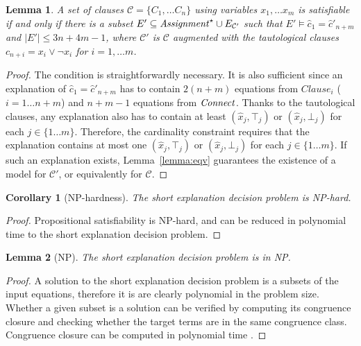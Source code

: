 \documentclass{easychair}
\newtheorem{corollary}{Corollary}
\newtheorem{lemma}{Lemma}
\begin{document}

\begin{lemma}
A set of clauses $\mathcal{C}= \{C_1, \dots C_n\}$ using variables $x_1,\dots
x_m$ is satisfiable if and only if there is a subset $E' \subseteq
{\it Assignment}^\star \cup E_{\mathcal{C}'}$ such that $E'\models \hat{c}_1 =
\hat{c}'_{n+m}$ and $|E'| \leq 3n+4m-1$, where $\mathcal{C}'$ is $\mathcal{C}$
augmented with the tautological clauses $c_{n+i} = x_i \vee \neg x_i$ for
$i=1,\dots m$.
\end{lemma}
\begin{proof}
The condition is straightforwardly necessary.  It is also sufficient since an
explanation of $\hat{c}_1 = \hat{c}'_{n+m}$ has to contain $2(n + m)$
equations from $Clause_i$ ($i= 1\dots n + m$) and $n + m - 1$ equations from
${\it Connect}$.  Thanks to the tautological clauses, any explanation also has to
contain at least $(\hat{x}_j,\top_j)$ or $(\hat{x}_j,\bot_j)$ for each
$j\in\{1\dots m\}$. Therefore, the cardinality constraint requires that the explanation
contains at most one $(\hat{x}_j,\top_j)$ or $(\hat{x}_j,\bot_j)$ for each
$j\in\{1\dots m\}$.  If such an explanation exists, Lemma~\ref{lemma:eqv}
guarantees the existence of a model for $\mathcal{C'}$, or equivalently for
$\mathcal{C}$.
\end{proof}




\begin{corollary}[NP-hardness]
\label{lemma:nphardness}
The short explanation decision problem is NP-hard.
\end{corollary}
\begin{proof}
Propositional satisfiability is NP-hard, and can be reduced in polynomial time
to the short explanation decision problem.
\end{proof}

\begin{lemma}[NP]
\label{lemma:innp}
The short explanation decision problem is in NP.
\end{lemma}
\begin{proof}
A solution to the short explanation decision problem is a subsets of the input equations, therefore it is are clearly polynomial in the problem size.  
Whether a given subset is a solution can be verified by computing its congruence closure and checking whether the target terms are in the same congruence class.
Congruence closure can be computed in polynomial time \cite{Nelson2,Downey1,Nieuwenhuis6}.
\end{proof}
\end{document}
